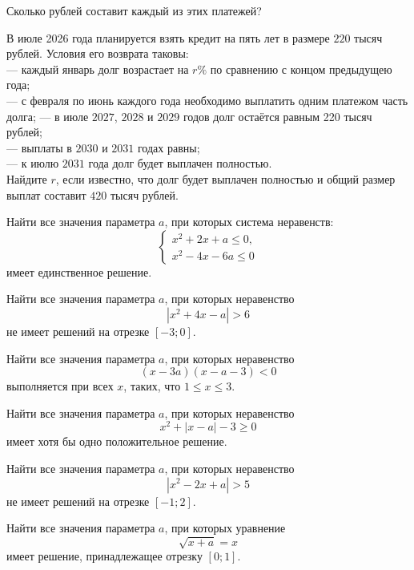 \begin{class}[number=1]
\begin{listofex}
		Сколько рублей составит каждый из этих платежей?
		\item В июле 2026 года планируется взять кредит на пять лет в размере \( 220 \) тысяч рублей.
		Условия его возврата таковы:\\
		--- каждый январь долг возрастает на \( r\% \) по сравнению с концом предыдущею года;\\
		--- с февраля по июнь каждого года необходимо выплатить одним платежом часть долга;
		--- в июле \( 2027 \), \( 2028 \) и \( 2029 \) годов долг остаётся равным 220 тысяч рублей;\\
		--- выплаты в \( 2030 \) и \( 2031 \) годах равны;\\
		--- к июлю \( 2031 \) года долг будет выплачен полностью.\\
		Найдите \( r \), если известно, что долг будет выплачен полностью и общий размер выплат составит \( 420 \) тысяч рублей.
	\end{listofex}
\end{class}

\begin{class}[number=2]
	\begin{listofex}
		\item Найти все значения параметра \( a \), при которых система неравенств:
		\[ \begin{cases}
			x^2+2x+a\le0,\\
			x^2-4x-6a\le0
		\end{cases} \]
		имеет единственное решение.
		\item Найти все значения параметра \( a \), при которых неравенство
		\[ |x^2+4x-a| > 6 \]
		не имеет решений на отрезке \( [-3;0] \).
	\end{listofex}
\end{class}

\begin{homework}[number=1]
	\begin{listofex}
		\item Найти все значения параметра \( a \), при которых неравенство
		\[ (x-3a)(x-a-3)<0 \]
		выполняется при всех \( x \), таких, что \( 1\le x \le 3 \).
		\item Найти все значения параметра \( a \), при которых неравенство
		\[ x^2+|x-a|-3\ge0 \]
		имеет хотя бы одно положительное решение.
		\item Найти все значения параметра \( a \), при которых неравенство
		\[ |x^2-2x+a| > 5 \]
		не имеет решений на отрезке \( [-1;2] \).
		\item Найти все значения параметра \( a \), при которых уравнение
		\[ \sqrt{x+a}=x \]
		имеет решение, принадлежащее отрезку \( [0;1] \).
	\end{listofex}
\end{homework}

